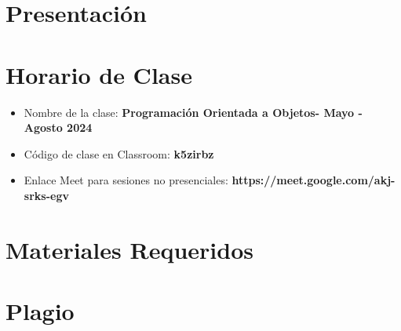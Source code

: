 \documentclass[aspectratio=169]{beamer}
\title[\abreviaturaNombreMateria]{\nombreMateria} %
\author{Dr. Marco Aurelio Nuño Maganda} %
\institute[UPV] %
{
Universidad Politecnica de Victoria \\ %
Ingenieria en Tecnologias de la Informacion \\ %
Cuatrimestre \cuatrimestre  \\ %
\medskip
\textit{mnunom@upv.edu.mx} %
}
\date{\today} %
\newcommand{\nombreMateria}{Programación Orientada a Objetos}
\newcommand{\cuatrimestre}{Mayo - Agosto 2024}
\newcommand{\claveClassroom}{k5zirbz}
\newcommand{\claveMeet}{https://meet.google.com/akj-srks-egv}
\begin{document}
\begin{frame}
\titlepage %
\end{frame}




\section{Presentación} 



\section{Horario de Clase}






\begin{frame}
\begin{itemize}
\frametitle{Plataforma Virtual para el Curso}
\item Nombre de la clase: \textbf{\nombreMateria - \cuatrimestre}
\item Código de clase en Classroom: \textbf{\claveClassroom}
\item Enlace Meet para sesiones no presenciales: \textbf{\claveMeet}
\end{itemize}

\end{frame}













\section{Materiales Requeridos}




\section{Plagio}

\end{document}
